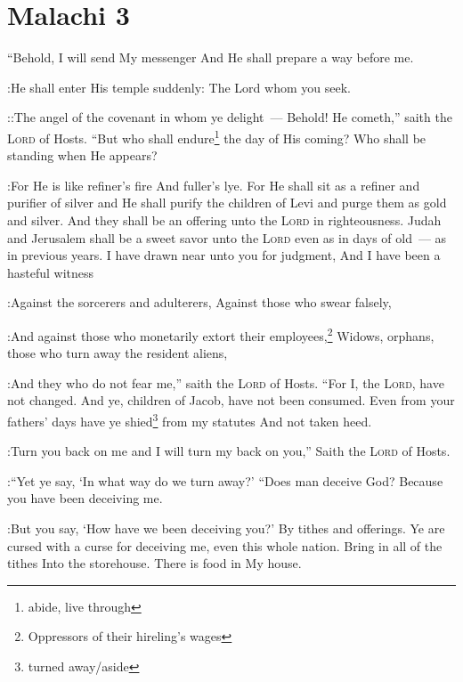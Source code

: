 \section{Malachi 3}\label{Malachi 3}
\begin{enumerate}
     ``Behold, I will send My messenger And He shall prepare a way before me.%

:He shall enter His temple suddenly: The Lord whom you seek.%

::The angel of the covenant in whom ye delight~--- Behold! He cometh,'' saith the \textsc{Lord} of Hosts.%
     ``But who shall endure\footnote{abide, live through} the day of His coming? Who shall be standing when He appears?%

:For He is like refiner's fire And fuller's lye.%
     For He shall sit as a refiner and purifier of silver and He shall purify the children of Levi and purge them as gold and silver. And they shall be an offering unto the \textsc{Lord} in righteousness.%
     Judah and Jerusalem shall be a sweet savor unto the \textsc{Lord} even as in days of old~--- as in previous years.%
     I have drawn near unto you for judgment, And I have been a hasteful witness%

:Against the sorcerers and adulterers, Against those who swear falsely,%

:And against those who monetarily extort their employees,\footnote{Oppressors of their hireling's wages} Widows, orphans, those who turn away the resident aliens,%

:And they who do not fear me,'' saith the \textsc{Lord} of Hosts.%
     ``For I, the \textsc{Lord}, have not changed. And ye, children of Jacob, have not been consumed.%
     Even from your fathers' days have ye shied\footnote{turned away/aside} from my statutes And not taken heed.%

:Turn you back on me and I will turn my back on you,'' Saith the \textsc{Lord} of Hosts.%

:``Yet ye say, `In what way do we turn away?'%
     ``Does man deceive God? Because you have been deceiving me.%

:But you say, `How have we been deceiving you?' By tithes and offerings.%
     Ye are cursed with a curse for deceiving me, even this whole nation.%
     Bring in all of the tithes Into the storehouse. There is food in My house.%


\end{enumerate}
